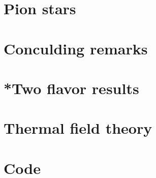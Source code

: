 \documentclass{book}
\begin{document}
    \chapter{Pion stars}
    \label{chapter: pion stars}
    

    \chapter{Conculding remarks}
    \label{Chapter: cocnlusion and discussion}
    

    \appendix

    \chapter[Appendix A]{}
    
    
    
    

    \chapter{*Two flavor results}
    
    
    
    
    \chapter{Thermal field theory}
    \label{appendix: thermal field theory}
    
    
    
    
    
    
    
    \chapter{Code}
    

    \cleardoublepage
    \printbibliography
\end{document}
